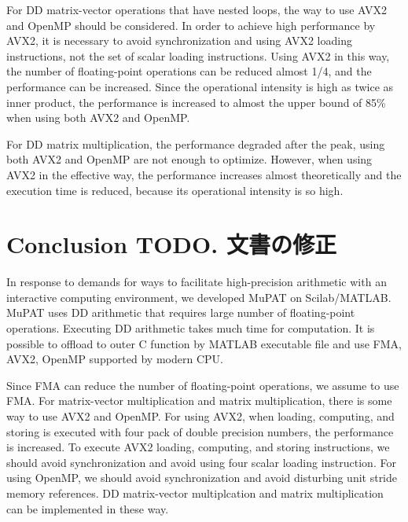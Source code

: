 \documentclass{IOS-Book-Article}
\begin{document}
For DD matrix-vector operations that have nested loops, the way to use AVX2 and OpenMP should be considered. In order to achieve high performance by AVX2, it is necessary to avoid synchronization and using AVX2 loading instructions, not the set of scalar loading instructions. Using AVX2 in this way, the number of floating-point operations can be reduced almost 1/4, and the performance can be increased. Since the operational intensity is high as twice as inner product, the performance is increased to almost the upper bound of 85\% when using both AVX2 and OpenMP. 

For DD matrix multiplication, the performance degraded after the peak, using both AVX2 and OpenMP are not enough to optimize. However, when using AVX2 in the effective way, the performance increases almost theoretically and the execution time is reduced, because its operational intensity is so high.

\section{Conclusion TODO. 文書の修正}
In response to demands for ways to facilitate high-precision arithmetic with an interactive computing environment, we developed MuPAT on Scilab/MATLAB. MuPAT uses DD arithmetic that requires large number of floating-point operations. Executing DD arithmetic takes much time for computation. It is possible to offload to outer C function by MATLAB executable file and use FMA, AVX2, OpenMP supported by modern CPU. 

Since FMA can reduce the number of floating-point operations, we assume to use FMA.  
For matrix-vector multiplication and matrix multiplication, there is some way to use AVX2 and OpenMP. 
For using AVX2, when loading, computing, and storing is executed with four pack of double precision numbers, the performance is increased. 
To execute AVX2 loading, computing, and storing instructions, we should avoid synchronization and avoid using four scalar loading instruction. 
For using OpenMP, we should avoid synchronization and avoid disturbing unit stride memory references.
DD matrix-vector multiplcation and matrix multiplication can be implemented in these way. 
\end{document}
